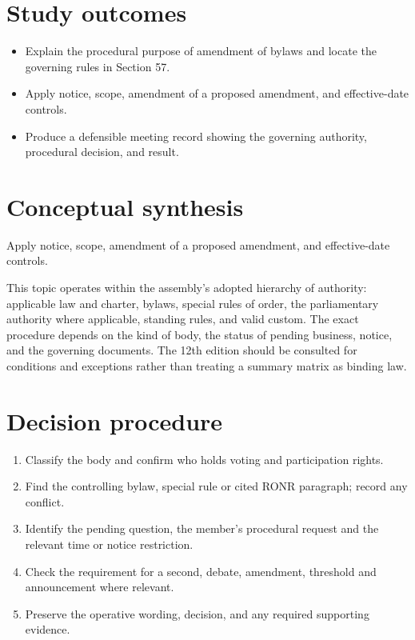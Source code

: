 \documentclass[11pt]{article}
\begin{document}
\SuiteOpen
{}
\section{Study outcomes}
\begin{itemize}[leftmargin=*,itemsep=4pt]
\item Explain the procedural purpose of amendment of bylaws and locate the governing rules in Section 57.
\item Apply notice, scope, amendment of a proposed amendment, and effective-date controls.
\item Produce a defensible meeting record showing the governing authority, procedural decision, and result.
\end{itemize}

\section{Conceptual synthesis}
Apply notice, scope, amendment of a proposed amendment, and effective-date controls.

This topic operates within the assembly’s adopted hierarchy of authority: applicable law and charter, bylaws, special rules of order, the parliamentary authority where applicable, standing rules, and valid custom. The exact procedure depends on the kind of body, the status of pending business, notice, and the governing documents. The 12th edition should be consulted for conditions and exceptions rather than treating a summary matrix as binding law.
\section{Decision procedure}
\begin{enumerate}[leftmargin=*,itemsep=4pt]
\item Classify the body and confirm who holds voting and participation rights.
\item Find the controlling bylaw, special rule or cited RONR paragraph; record any conflict.
\item Identify the pending question, the member’s procedural request and the relevant time or notice restriction.
\item Check the requirement for a second, debate, amendment, threshold and announcement where relevant.
\item Preserve the operative wording, decision, and any required supporting evidence.
\end{enumerate}
\end{document}
